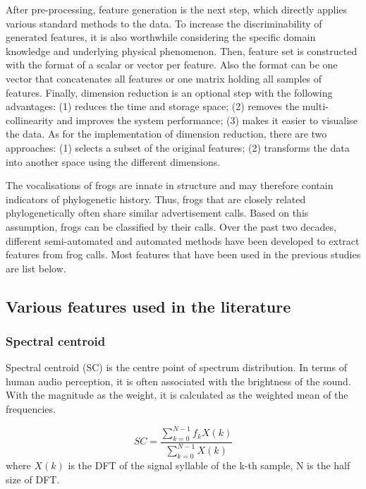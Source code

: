 After pre-processing, feature generation is the next step, which directly applies various standard methods to the data. To increase the discriminability of generated features, it is also worthwhile considering the specific domain knowledge and underlying physical phenomenon. Then, feature set is constructed with the format of a scalar or vector per feature. Also the format can be one vector that concatenates all features or one matrix holding all samples of features. Finally, dimension reduction is an optional step with the following advantages: (1) reduces the time and storage space; (2) removes the multi-collinearity and improves the system performance; (3) makes it easier to visualise the data. As for the implementation of dimension reduction, there are two approaches: (1) selects a subset of the original features; (2) transforms the data into another space using the different dimensions. 

The vocalisations of frogs are innate in structure and may therefore contain indicators of phylogenetic history. Thus, frogs that are closely related phylogenetically often share similar advertisement calls.  Based on this assumption, frogs can be classified by their calls. Over the past two decades, different semi-automated and automated methods have been developed to extract features from frog calls. Most features that have been used in the previous studies are list below.


\subsection{Various features used in the literature}

\subsubsection{Spectral centroid}
Spectral centroid (SC) is the centre point of spectrum distribution. In terms of human audio perception, it is often associated with the brightness of the sound. With the magnitude as the weight, it is calculated as the weighted mean of the frequencies.

\begin{equation}
SC=\frac{\sum_{k=0}^{N-1}f_{k}X(k)}{\sum_{k=0}^{N-1}X(k)}
\end{equation}
where $X(k)$ is the DFT of the signal syllable of the k-th sample, N is the half size of DFT. 

